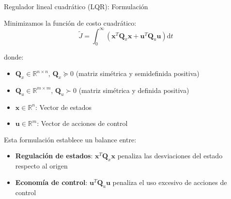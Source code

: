 \documentclass{beamer}
\begin{document}
\begin{frame}{Regulador lineal cuadrático (LQR): Formulación}

Minimizamos la función de costo cuadrático:
\begin{equation}
\tilde{J} = \int_{0}^{\infty} \left( \mathbf{x}^T\mathbf{Q}_x\mathbf{x} + \mathbf{u}^T\mathbf{Q}_u\mathbf{u} \right) \mathrm{d}t
\label{eq:costo_quadratico}
\end{equation}

donde:
\begin{itemize}
\item $\mathbf{Q}_x \in \mathbb{R}^{n \times n}$, $\mathbf{Q}_x \succeq 0$ (matriz simétrica y semidefinida positiva)
\item $\mathbf{Q}_u \in \mathbb{R}^{m \times m}$, $\mathbf{Q}_u \succ 0$ (matriz simétrica y definida positiva)
\item $\mathbf{x} \in \mathbb{R}^n$: Vector de estados
\item $\mathbf{u} \in \mathbb{R}^m$: Vector de acciones de control
\end{itemize}

Esta formulación establece un balance entre:
\begin{itemize}
\item \textbf{Regulación de estados}: $\mathbf{x}^T\mathbf{Q}_x\mathbf{x}$ penaliza las desviaciones del estado respecto al origen
\item \textbf{Economía de control}: $\mathbf{u}^T\mathbf{Q}_u\mathbf{u}$ penaliza el uso excesivo de acciones de control
\end{itemize}

\end{frame}
\end{document}
